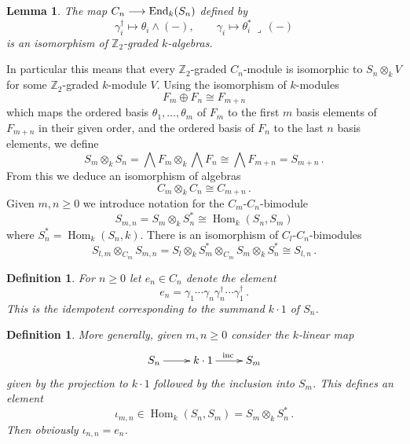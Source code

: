 \documentclass[english,letter paper,12pt,leqno]{article}
\newtheorem{lemma}[theorem]{Lemma}
\theoremstyle{example}
\newtheorem{definition}[theorem]{Definition}
\numberwithin{equation}{section}
\def\Hom{\operatorname{Hom}}
\def\ferm{\gamma}
\def\fermc{\gamma^\dagger}
\DeclareMathOperator{\End}{End}
\begin{document}
\begin{lemma}\label{defn:spinorrep} The map $C_n \lto \End_k(S_n)$ defined by
\[
\fermc_i \mapsto \theta_i \wedge (-), \qquad \ferm_i \mapsto \theta_i^*\, \lrcorner\, (-)
\]
is an isomorphism of $\mathbb{Z}_2$-graded $k$-algebras.
\end{lemma}

In particular this means that every $\mathbb{Z}_2$-graded $C_n$-module is isomorphic to $S_n \otimes_k V$ for some $\mathbb{Z}_2$-graded $k$-module $V$. Using the isomorphism of $k$-modules
\[
F_m \oplus F_n \cong F_{m+n}
\]
which maps the ordered basis $\theta_1,\ldots,\theta_m$ of $F_m$ to the first $m$ basis elements of $F_{m+n}$ in their given order, and the ordered basis of $F_n$ to the last $n$ basis elements, we define
\[
S_m \otimes_k S_n = \bigwedge F_m \otimes_k \bigwedge F_n \cong \bigwedge F_{m+n} = S_{m+n}\,.
\]
From this we deduce an isomorphism of algebras
\begin{equation}\label{eq:algebra_A_additive}
C_m \otimes_k C_n \cong C_{m+n}\,.
\end{equation}
Given $m, n \ge 0$ we introduce notation for the $C_m$-$C_n$-bimodule
\begin{equation}
S_{m,n} = S_m \otimes_k S_n^* \cong \Hom_k(S_n,S_m)
\end{equation}
where $S_n^* = \Hom_k(S_n, k)$. There is an isomorphism of $C_l$-$C_n$-bimodules
\begin{equation}\label{eq:isosbimodule}
S_{l,m} \otimes_{C_m} S_{m,n} = S_l \otimes_k S_m^* \otimes_{C_m} S_m \otimes_k S_n^* \cong S_{l,n}\,.
\end{equation}

\begin{definition}\label{defn:idempotent_e} For $n \ge 0$ let $e_n \in C_n$ denote the element
\[
e_n = \ferm_1 \cdots \ferm_n \fermc_n \cdots \fermc_1\,.
\]
This is the idempotent corresponding to the summand $k \cdot 1$ of $S_n$.
\end{definition}

\begin{definition}\label{defn:idempotent_gen} More generally, given $m, n \ge 0$ consider the $k$-linear map
\[
\xymatrix{
S_n \ar[r] & k \cdot 1 \ar[r]^{\operatorname{inc}} & S_m
}
\]
given by the projection to $k \cdot 1$ followed by the inclusion into $S_m$. This defines an element
\[
\iota_{m,n} \in \Hom_k(S_n, S_m) = S_m \otimes_k S_n^*\,.
\]
Then obviously $\iota_{n,n} = e_n$.
\end{definition}
\end{document}
